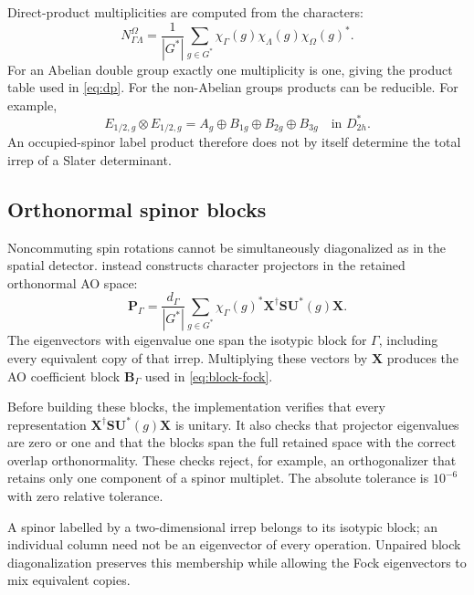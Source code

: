 \documentclass[aip,jcp,preprint,nobibnotes,nofootinbib]{revtex4-1}
\newcommand{\bvec}[1]{\mathbf{#1}}
\newcommand{\code}[1]{\texttt{\detokenize{#1}}}
\begin{document}
Direct-product multiplicities are computed from the characters:
\begin{equation}
 N_{\Gamma\Lambda}^{\Omega}
 =\frac{1}{|G^*|}\sum_{g\in G^*}
   \chi_\Gamma(g)\chi_\Lambda(g)\chi_\Omega(g)^*.
 \label{eq:products}
\end{equation}
For an Abelian double group exactly one multiplicity is one, giving the
product table used in \cref{eq:dp}. For the non-Abelian groups products can be
reducible. For example,
\begin{equation}
 E_{1/2,g}\otimes E_{1/2,g}
   =A_g\oplus B_{1g}\oplus B_{2g}\oplus B_{3g}
 \quad\text{in }D_{2h}^*.
 \label{eq:reducible}
\end{equation}
An occupied-spinor label product therefore does not by itself determine the
total irrep of a Slater determinant.

\subsection{Orthonormal spinor blocks}

Noncommuting spin rotations cannot be simultaneously diagonalized as in the
spatial detector. \code{DoubleGroupBasis} instead constructs character
projectors in the retained orthonormal AO space:
\begin{equation}
 \bvec{P}_\Gamma
  =\frac{d_\Gamma}{|G^*|}\sum_{g\in G^*}\chi_\Gamma(g)^*
    \bvec{X}^\dagger\bvec{S}\bvec{U}^*(g)\bvec{X}.
 \label{eq:spinor-projector}
\end{equation}
The eigenvectors with eigenvalue one span the isotypic block for $\Gamma$,
including every equivalent copy of that irrep. Multiplying these vectors by
$\bvec{X}$ produces the AO coefficient block $\bvec{B}_\Gamma$ used in
\cref{eq:block-fock}.

Before building these blocks, the implementation verifies that every
representation $\bvec{X}^\dagger\bvec{S}\bvec{U}^*(g)\bvec{X}$ is unitary.
It also checks that projector eigenvalues are zero or one and that the blocks
span the full retained space with the correct overlap orthonormality. These
checks reject, for example, an orthogonalizer that retains only one component
of a spinor multiplet. The absolute tolerance is $10^{-6}$ with zero relative
tolerance.

A spinor labelled by a two-dimensional irrep belongs to its isotypic block;
an individual column need not be an eigenvector of every operation.
Unpaired block diagonalization preserves this membership while allowing the
Fock eigenvectors to mix equivalent copies.
\end{document}
